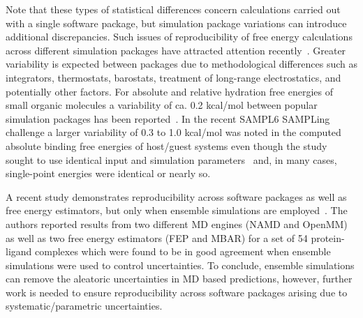 \documentclass[9pt,bestpractices]{livecoms}
\begin{document}
Note that these types of statistical differences concern calculations carried out with a single software package, but simulation package variations can introduce additional discrepancies. Such issues of reproducibility of free energy calculations across different simulation packages have attracted attention recently~\cite{loeffler2018reproducibility,rizzi2019sampl6, wade2022}. Greater variability is expected between packages due to methodological differences such as integrators, thermostats, barostats, treatment of long-range electrostatics, and potentially other factors. For absolute and relative hydration free energies of small organic molecules a variability of ca. 0.2 kcal/mol between popular simulation packages has been reported~\cite{loeffler2018reproducibility}. In the recent SAMPL6 SAMPLing challenge a larger variability of 0.3 to 1.0 kcal/mol was noted in the computed absolute binding free energies of host/guest systems even though the study sought to use identical input and simulation parameters~\cite{rizzi2019sampl6} and, in many cases, single-point energies were identical or nearly so. 

A recent study demonstrates reproducibility across software packages as well as free energy estimators, but only when ensemble simulations are employed~\cite{wade2022}. The authors reported results from two different MD engines (NAMD and OpenMM) as well as two free energy estimators (FEP and MBAR) for a set of 54 protein-ligand complexes which were found to be in good agreement when ensemble simulations were used to control uncertainties. To conclude, ensemble simulations can remove the aleatoric uncertainties in MD based predictions, however, further work is needed to ensure reproducibility across software packages arising due to systematic/parametric uncertainties.
\end{document}
